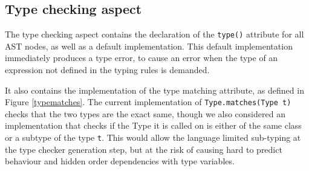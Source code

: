 \documentclass[nofilelist]{cslthse-msc}
\newcommand{\CR}[1]{\textcolor{green!60!black}{[\textbf{CR}:#1]}}
\newcommand{\reviewquestion}[1]{\textcolor{red!80!black}{[\textbf{Review question}:#1]}}
\begin{document}

\subsection{Type checking aspect}\label{typecheckingaspect}
The type checking aspect contains the declaration of the \lstinline{type()} attribute for all AST nodes, as well as a default implementation.
This default implementation immediately produces a type error, to cause an error when the type of an expression not defined in the typing rules is demanded.

It also contains the implementation of the type matching attribute, as defined in Figure \ref{typematches}.
The current implementation of \lstinline{Type.matches(Type t)} checks that the two types are the exact same, though we also considered an implementation that checks if the Type it is called on is either of the same class or a subtype of the type \lstinline{t}.
This would allow the language limited sub-typing at the type checker generation step, but at the risk of causing hard to predict behaviour and hidden order dependencies with type variables.
\end{document}
